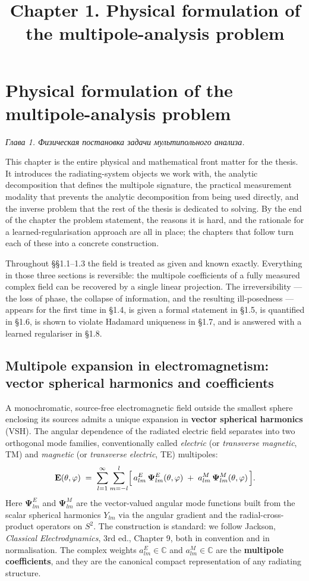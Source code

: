 \documentclass[11pt,a4paper]{report}
\title{Chapter 1. Physical formulation of the multipole-analysis problem}
\author{}
\date{}
\newcommand{\rutext}[1]{\foreignlanguage{russian}{#1}}
\begin{document}
\chapter{Physical formulation of the multipole-analysis problem}

\noindent\hfill\emph{\rutext{Глава 1. Физическая постановка задачи мультипольного анализа.}}\hfill\null
\bigskip

This chapter is the entire physical and mathematical front matter for the thesis.
It introduces the radiating-system objects we work with, the analytic decomposition
that defines the multipole signature, the practical measurement modality that prevents
the analytic decomposition from being used directly, and the inverse problem that the
rest of the thesis is dedicated to solving. By the end of the chapter the problem
statement, the reasons it is hard, and the rationale for a learned-regularisation
approach are all in place; the chapters that follow turn each of these into a concrete
construction.

Throughout \S\S1.1--1.3 the field is treated as given and known exactly. Everything
in those three sections is reversible: the multipole coefficients of a fully measured
complex field can be recovered by a single linear projection. The irreversibility ---
the loss of phase, the collapse of information, and the resulting ill-posedness ---
appears for the first time in \S1.4, is given a formal statement in \S1.5, is
quantified in \S1.6, is shown to violate Hadamard uniqueness in \S1.7, and is
answered with a learned regulariser in \S1.8.
\section{Multipole expansion in electromagnetism: vector spherical harmonics and coefficients}

A monochromatic, source-free electromagnetic field outside the smallest sphere
enclosing its sources admits a unique expansion in \textbf{vector spherical harmonics}
(VSH). The angular dependence of the radiated electric field separates into two
orthogonal mode families, conventionally called \emph{electric} (or \emph{transverse
magnetic}, TM) and \emph{magnetic} (or \emph{transverse electric}, TE) multipoles:
\[
\mathbf{E}(\theta,\varphi) \;=\; \sum_{l=1}^{\infty}\sum_{m=-l}^{l}
\Bigl[\, a^E_{lm}\,\boldsymbol{\Psi}^E_{lm}(\theta,\varphi) \;+\; a^M_{lm}\,\boldsymbol{\Psi}^M_{lm}(\theta,\varphi)\,\Bigr].
\]
Here $\boldsymbol{\Psi}^E_{lm}$ and $\boldsymbol{\Psi}^M_{lm}$ are the vector-valued
angular mode functions built from the scalar spherical harmonics $Y_{lm}$ via the
angular gradient and the radial-cross-product operators on $S^2$. The construction is
standard: we follow Jackson, \emph{Classical Electrodynamics}, 3rd ed., Chapter 9,
both in convention and in normalisation. The complex weights
$a^E_{lm}\in\mathbb{C}$ and $a^M_{lm}\in\mathbb{C}$ are the
\textbf{multipole coefficients}, and they are the canonical compact representation of
any radiating structure.
\end{document}
